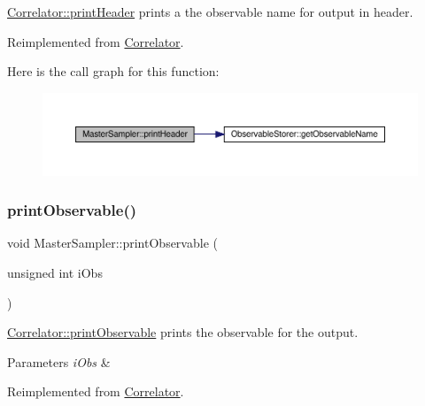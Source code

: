 \mbox{\hyperlink{class_correlator_ac7c5a07d7cbee97c417a1659b93083b2}{Correlator\+::print\+Header}} prints a the observable name for output in header. 



Reimplemented from \mbox{\hyperlink{class_correlator_ac7c5a07d7cbee97c417a1659b93083b2}{Correlator}}.

Here is the call graph for this function\+:
\nopagebreak
\begin{figure}[H]
\begin{center}
\leavevmode
\includegraphics[width=350pt]{class_master_sampler_a51b207672764c100e1ae258fd2e33fcf_cgraph}
\end{center}
\end{figure}
\mbox{\label{class_master_sampler_a41853c3e4ab52fca7d93cf80e8702b7a}} 
\subsubsection{\texorpdfstring{printObservable()}{printObservable()}}
{\footnotesize\ttfamily void Master\+Sampler\+::print\+Observable (\begin{DoxyParamCaption}\item[{unsigned int}]{i\+Obs }\end{DoxyParamCaption})\hspace{0.3cm}{\ttfamily [virtual]}}



\mbox{\hyperlink{class_correlator_a15744ddb9f2b71fff34ac762d101df38}{Correlator\+::print\+Observable}} prints the observable for the output. 


\begin{DoxyParams}{Parameters}
{\em i\+Obs} & \\
\hline
\end{DoxyParams}


Reimplemented from \mbox{\hyperlink{class_correlator_a15744ddb9f2b71fff34ac762d101df38}{Correlator}}.

